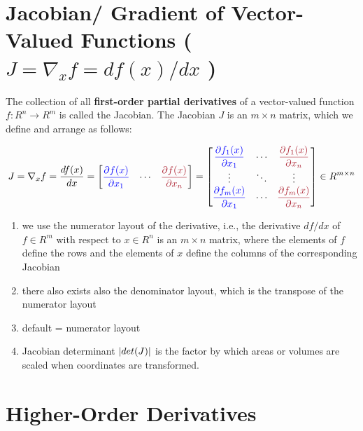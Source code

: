 \section{Jacobian/ Gradient of Vector-Valued Functions ( $J = \nabla_x f = df(x)/dx$ )}\label{Jacobian/ Gradient of Vector-Valued Functions}

The collection of all \textbf{first-order partial derivatives} of a vector-valued function $f : R^n \to R^m$ is called the Jacobian. The Jacobian $J$ is an $m \times n$ matrix, which we define and arrange as follows:

\[
    J = \nabla_x f =
    \dfrac{df(x)}{dx} =
    \begin{bmatrix}
        \textcolor{blue}{\dfrac{\partial f(x)}{\partial x_1}} &
        \cdots &
        \textcolor{Maroon}{\dfrac{\partial f(x)}{\partial x_n}}
    \end{bmatrix} =
    \begin{bmatrix}
        \textcolor{blue}{\dfrac{\partial f_1(x)}{\partial x_1}} &
        \cdots &
        \textcolor{Maroon}{\dfrac{\partial f_1(x)}{\partial x_n}}\\
        \vdots & \ddots & \vdots \\
        \textcolor{blue}{\dfrac{\partial f_m(x)}{\partial x_1}} &
        \cdots &
        \textcolor{Maroon}{\dfrac{\partial f_m(x)}{\partial x_n}}\\
    \end{bmatrix}
    \in R^{m\times n}
\]

\begin{enumerate}
    \item we use the numerator layout of the derivative, i.e., the derivative $df/dx$ of $f \in R^m$ with respect to $x \in R^n$ is an $m \times n$ matrix, where the elements of $f$ define the rows and the elements of $x$ define the columns of the corresponding Jacobian

    \item there also exists also the denominator layout, which is the transpose of the numerator layout

    \item default = numerator layout

    \item Jacobian determinant $\left| det(J) \right|$ is the factor by which areas or volumes are scaled when coordinates are transformed.
\end{enumerate}


\section{Higher-Order Derivatives}\label{Higher-Order Derivatives}

